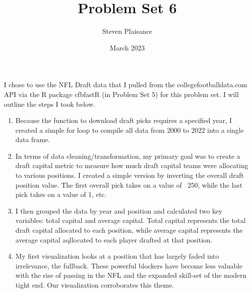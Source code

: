 \documentclass{article}
\title{Problem Set 6}
\author{Steven Plaisance}
\date{March 2023}
\begin{document}
\maketitle

I chose to use the NFL Draft data that I pulled from the collegefootballdata.com API via the R package cfbfastR (in Problem Set 5) for this problem set. I will outline the steps I took below.

\begin{enumerate}
  \item Because the function to download draft picks requires a specified year, I created a simple for loop to compile all data from 2000 to 2022 into a single data frame.
  \item In terms of data cleaning/transformation, my primary goal was to create a draft capital metric to measure how much draft capital teams were allocating to various positions. I created a simple version by inverting the overall draft position value. The first overall pick takes on a value of ~250, while the last pick takes on a value of 1, etc. 
  \item I then grouped the data by year and position and calculated two key variables: total capital and average capital. Total capital represents the total draft capital allocated to each position, while average capital represents the average capital aqllocated to each player drafted at that position. 
  \newpage
  \item My first visualization looks at a position that has largely faded into irrelevance, the fullback. These powerful blockers have become less valuable with the rise of passing in the NFL and the expanded skill-set of the modern tight end. Our visualization corroborates this theme.
  

\end{enumerate}
\end{document}
